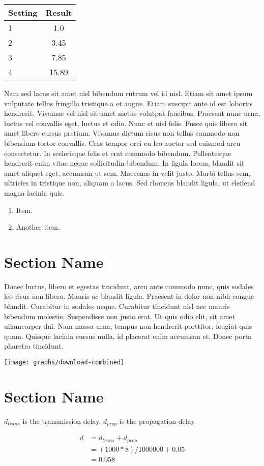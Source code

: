 \documentclass[fleqn,11pt]{article}
\begin{document}
	\vspace{0.5cm}
	\begin{tabular}{lc}
	  \toprule
	  Setting & Result\\
	  \midrule
	  1 & 1.0\\
	  2 & 3.45\\
	  3 & 7.85\\
	  4 & 15.89\\
	  \bottomrule
	\end{tabular}
	\vspace{0.5cm}
	
	Nam sed lacus sit amet nisl bibendum rutrum vel id nisl. Etiam sit
	amet ipsum vulputate tellus fringilla tristique a et augue. Etiam
	suscipit ante id est lobortis hendrerit. Vivamus vel nisl sit amet
	metus volutpat faucibus. Praesent nunc urna, luctus vel convallis
	eget, luctus et odio. Nunc et nisl felis. Fusce quis libero sit amet
	libero cursus pretium. Vivamus dictum risus non tellus commodo non
	bibendum tortor convallis. Cras tempor orci eu leo auctor sed euismod
	arcu consectetur. In scelerisque felis et erat commodo
	bibendum. Pellentesque hendrerit enim vitae neque sollicitudin
	bibendum. In ligula lorem, blandit sit amet aliquet eget, accumsan ut
	sem. Maecenas in velit justo. Morbi tellus sem, ultricies in tristique
	non, aliquam a lacus. Sed rhoncus blandit ligula, ut eleifend magna
	lacinia quis.
	
	\begin{enumerate}
	
	\item Item.
	
	\item Another item.
	
	\end{enumerate}
	
	\section{Section Name}
	
	Donec luctus, libero et egestas tincidunt, arcu ante commodo nunc,
	quis sodales leo risus non libero. Mauris ac blandit ligula. Praesent
	in dolor non nibh congue blandit. Curabitur in sodales
	neque. Curabitur tincidunt nisl nec mauris bibendum
	molestie. Suspendisse non justo erat. Ut quis odio elit, sit amet
	ullamcorper dui. Nam massa urna, tempus non hendrerit porttitor,
	feugiat quis quam. Quisque lacinia cursus nulla, id placerat enim
	accumsan et. Donec porta pharetra tincidunt.
	
	\texttt{[image: graphs/download-combined]}
	
	\section{Section Name}
	
	$d_{trans}$ is the transmission delay. $d_{prop}$ is the propagation delay.
	
	\begin{align*}
	d &= d_{trans} + d_{prop}\\
	  &= (1000*8)/1000000 + 0.05\\
	  &= 0.058
	\end{align*}
	
	
\end{document}
